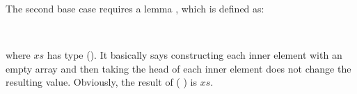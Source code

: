 \documentclass{l4proj}
\begin{document}
The second base case requires a lemma , which is defined as:
\begin{code}%
\>[0]\AgdaSpace{}%
\AgdaSymbol{:}%
\>[125I]\AgdaSymbol{\{}\AgdaSpace{}%
\AgdaSpace{}%
\AgdaSymbol{:}\AgdaSpace{}%
\AgdaSymbol{\}}\AgdaSpace{}%
\AgdaSpace{}%
\AgdaSymbol{\{}\AgdaSpace{}%
\AgdaSymbol{:}\AgdaSpace{}%
\AgdaSymbol{\}}\AgdaSpace{}%
\AgdaSpace{}%
\AgdaSymbol{(}\AgdaSpace{}%
\AgdaSymbol{:}\AgdaSpace{}%
\AgdaSpace{}%
\AgdaSymbol{(}\AgdaSpace{}%
\AgdaSpace{}%
\AgdaSymbol{)}\AgdaSpace{}%
\AgdaSymbol{)}\AgdaSpace{}%
\<%
\\
\>[.][@{}l@{}]\<[125I]%
\>[14]\AgdaSpace{}%
\AgdaSpace{}%
\AgdaSymbol{(}\AgdaSpace{}%
\AgdaSpace{}%
\AgdaSpace{}%
\AgdaSpace{}%
\AgdaSpace{}%
\AgdaSpace{}%
\AgdaInductiveConstructor{[]}\AgdaSymbol{)}\AgdaSpace{}%
\AgdaSymbol{)}\AgdaSpace{}%
\AgdaSpace{}%
\<%
\end{code}
where $xs$ has type (\AgdaSpace{}\AgdaSpace{}). It basically says constructing each inner element with an empty array and then taking the head of each inner element does not change the resulting value. Obviously, the result of ( \AgdaSpace{}\AgdaSpace{} \AgdaInductiveConstructor{[]}) is $xs$. 
\end{document}
